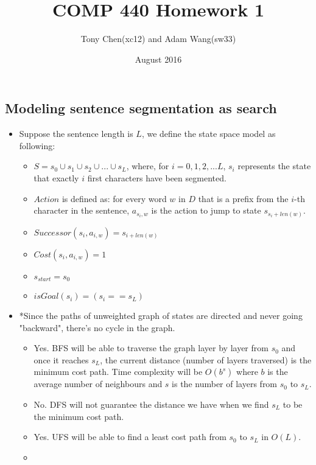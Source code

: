 \documentclass[11pt]{article}
\title{COMP 440 Homework 1}
\author{Tony Chen(xc12) and Adam Wang(sw33)}
\date{August 2016}
\begin{document}
\begin{onehalfspace}
    \maketitle
    \newpage{}
    \section{Modeling sentence segmentation as search}
    \begin{itemize}
        \item
        Suppose the sentence length is $L$, we define the state space model as following:
        \begin{itemize}
            \item
            $S = s_0\cup s_1\cup s_2\cup ... \cup s_L$, where, for $i = 0, 1, 2, ... L$, $s_i$ represents the state that exactly $i$ first characters have been segmented.
            \item
            $Action$ is defined as: for every word $w$ in $D$ that is a prefix from the $i$-th character in the sentence, $a_{s_i,w}$ is the action to jump to state $s_{s_i+len(w)}$.
            \item
            $Successor(s_i, a_{i,w}) = s_{i+len(w)}$
            \item
            $Cost(s_i, a_{i,w}) = 1$
            \item
            $s_{start} = s_0$
            \item
            $isGoal(s_i) = (s_i == s_L)$
        \end{itemize}
        \item
        *Since the paths of unweighted graph of states are directed and never going "backward", there's no cycle in the graph.
        \begin{itemize}
            \item
            Yes. BFS will be able to traverse the graph layer by layer from $s_0$ and once it reaches $s_L$, the current distance (number of layers traversed) is the minimum cost path. Time complexity will be $O(b^s)$ where $b$ is the average number of neighbours and $s$ is the number of layers from $s_0$ to $s_L$.
            \item
            No. DFS will not guarantee the distance we have when we find $s_L$ to be the minimum cost path.
            \item
            Yes. UFS will be able to find a least cost path from $s_0$ to $s_L$ in $O(L)$.
            \item

\end{itemize}
\end{itemize}
\end{onehalfspace}
\end{document}
